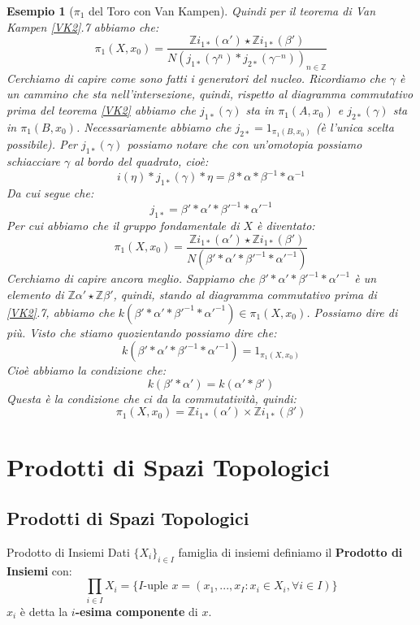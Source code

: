 \documentclass[11pt,a4paper,twoside]{article}
\newtheorem{es}{Esempio}
\theoremstyle{definition}
\begin{document}
\begin{es}[$\pi_1$ del Toro con Van Kampen]
	Quindi per il teorema di Van Kampen \ref{VK2}.7 abbiamo che:
	\[ \pi_1(X, x_0) = \frac{\mathbb Z i_{1*}(\alpha') \star \mathbb Z i_{1*}(\beta')}{N(j_{1*}(\gamma^n) * j_{2*}(\gamma^{-n}))_{n \in \mathbb Z}} \]
	Cerchiamo di capire come sono fatti i generatori del nucleo. Ricordiamo che $\gamma$ è un cammino che sta nell'intersezione, quindi, rispetto al diagramma commutativo prima del teorema \ref{VK2} abbiamo che $j_{1*}(\gamma)$ sta in $\pi_1(A, x_0)$ e $j_{2*}(\gamma)$ sta in $\pi_1(B, x_0)$. Necessariamente abbiamo che $j_{2*} = 1_{\pi_1(B, x_0)}$ (è l'unica scelta possibile).
	Per $j_{1*}(\gamma)$ possiamo notare che con un'omotopia possiamo schiacciare $\gamma$ al bordo del quadrato, cioè:
	\[ i(\eta)*j_{1*}(\gamma)*\eta = \beta*\alpha*\beta^{-1} * \alpha^{-1} \]
	Da cui segue che:
	\[ j_{1*} = \beta' * \alpha' * \beta'^{-1} * \alpha'^{-1} \]
	Per cui abbiamo che il gruppo fondamentale di $X$ è diventato:
	\[ \pi_1(X, x_0) = \frac{\mathbb Z i_{1*}(\alpha') \star \mathbb Z i_{1*}(\beta')}{N(\beta'*\alpha'*\beta'^{-1}*\alpha'^{-1})} \]
	Cerchiamo di capire ancora meglio. Sappiamo che $\beta'*\alpha'*\beta'^{-1}*\alpha'^{-1}$ è un elemento di $\mathbb Z\alpha' \star \mathbb Z\beta'$, quindi, stando al diagramma commutativo prima di \ref{VK2}.7, abbiamo che $k(\beta'*\alpha'*\beta'^{-1}*\alpha'^{-1}) \in \pi_1(X,x_0)$.
	Possiamo dire di più. Visto che stiamo quozientando possiamo dire che:
	\[ k(\beta' * \alpha' *\beta'^{-1} * \alpha'^{-1}) = 1_{\pi_1(X, x_0)} \]
	Cioè abbiamo la condizione che:
	\[ k(\beta'*\alpha') = k(\alpha' * \beta') \]
	Questa è la condizione che ci da la commutatività, quindi:
	\[ \pi_1(X,x_0) = \mathbb Z i_{1*}(\alpha') \times \mathbb Z i_{1*}(\beta') \]
\end{es}

\newpage

\section{Prodotti di Spazi Topologici}

\subsection{Prodotti di Spazi Topologici}

\begin{defn}{Prodotto di Insiemi}{}{}
	Dati $\{X_i\}_{i \in I}$ famiglia di insiemi definiamo il \textbf{Prodotto di Insiemi} con:
	\[ \prod_{i \in I}X_i = \{I\text{-uple }x = (x_1,...,x_I: x_i \in X_i, \forall i \in I)\}  \]
	$x_i$ è detta la \textbf{$i$-esima componente} di $x$.
\end{defn}
\end{document}

